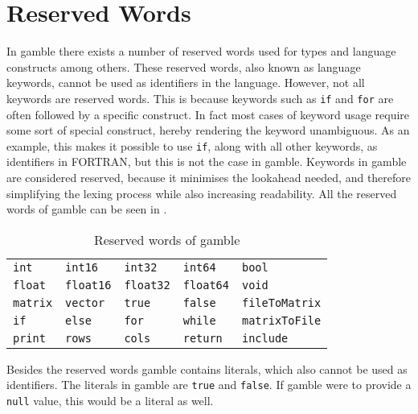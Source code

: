 \section{Reserved Words}
\label{sec:reserved_words}
In \gls{gamble} there exists a number of reserved words used for types and language constructs among others.
These reserved words, also known as language keywords, cannot be used as identifiers in the language. 
However, not all keywords are reserved words.
This is because keywords such as \texttt{if} and \texttt{for} are often followed by a specific construct.
In fact most cases of keyword usage require some sort of special construct, hereby rendering the keyword unambiguous.
As an example, this makes it possible to use \texttt{if}, along with all other keywords, as identifiers in FORTRAN, but this is not the case in \gls{gamble}. \citep{fortran_identifiers}
Keywords in \gls{gamble} are considered reserved, because it minimises the lookahead needed, and therefore simplifying the lexing process while also increasing readability.
All the reserved words of \gls{gamble} can be seen in .
\begin{table}[h!]
	\centering
	\def\arraystretch{1.5} \setlength{\tabcolsep}{2em}
	\begin{tabular}{l l l l l}
        \texttt{int}     & \texttt{int16}     & \texttt{int32}     & \texttt{int64}     & \texttt{bool}    \\
        \texttt{float}   & \texttt{float16}   & \texttt{float32}   & \texttt{float64}   & \texttt{void}    \\
        \texttt{matrix}  & \texttt{vector}    & \texttt{true}      & \texttt{false}     & \texttt{fileToMatrix} \\
        \texttt{if}      & \texttt{else}      & \texttt{for}       & \texttt{while}     & \texttt{matrixToFile} \\
        \texttt{print}   & \texttt{rows}      & \texttt{cols}      & \texttt{return}    & \texttt{include} \\
    \end{tabular}
    \caption{Reserved words of \gls{gamble}}\label{res:words}
	\def\arraystretch{1}
\end{table}

Besides the reserved words \gls{gamble} contains literals, which also cannot be used as identifiers.
The literals in \gls{gamble} are \texttt{true} and \texttt{false}.
If \gls{gamble} were to provide a \texttt{null} value, this would be a literal as well.


